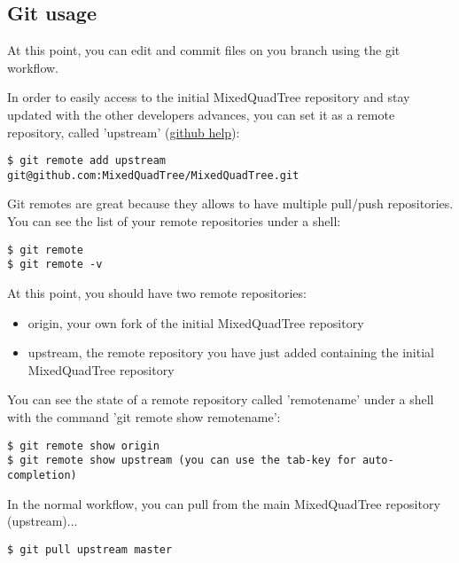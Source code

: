 \documentclass[10pt]{article}
\begin{document}
\subsection{Git usage}
At this point, you can edit and commit files on you branch using  the git workflow.

In order to easily access to the initial MixedQuadTree repository and stay updated with the other developers advances, you can set it as a remote repository, called 'upstream' (\href{https://help.github.com/articles/syncing-a-fork/}{github help}):


\begin{tcolorbox}
\begin{verbatim}
$ git remote add upstream git@github.com:MixedQuadTree/MixedQuadTree.git
\end{verbatim}
\end{tcolorbox}

Git remotes are great because they allows to have multiple pull/push repositories. You can see the list of your remote repositories under a shell:

\begin{tcolorbox}
\begin{verbatim}
$ git remote
$ git remote -v
\end{verbatim}
\end{tcolorbox}

At this point, you should have two remote repositories:
%
\begin{itemize}
\item origin, your own fork of the initial MixedQuadTree repository
\item upstream, the remote repository you have just added containing the initial MixedQuadTree repository
\end{itemize}

You can see the state of a remote repository called 'remotename' under a shell with the command 'git remote show remotename':
%
\begin{tcolorbox}\begin{verbatim}
$ git remote show origin
$ git remote show upstream (you can use the tab-key for auto-completion)
\end{verbatim}
\end{tcolorbox}

In the normal workflow, you can pull from the main MixedQuadTree repository (upstream)...
%
\begin{tcolorbox}\begin{verbatim}
$ git pull upstream master
\end{verbatim}
 \end{tcolorbox}
\end{document}
